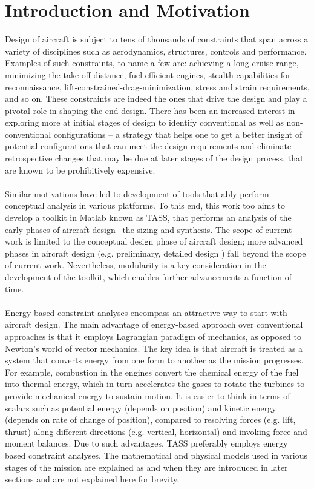 \documentclass[pdftex,11pt,letter]{article}
\begin{document}
\section{Introduction and Motivation}

Design of aircraft is subject to tens of thousands of constraints that span across a variety of disciplines such as aerodynamics, structures, controls and performance\cite{NicolaiText,FieldingText,HoweText,RaymerText}. Examples of such constraints, to name a few are: achieving a long cruise range, minimizing the take-off distance, fuel-efficient engines, stealth capabilities for reconnaissance, lift-constrained-drag-minimization, stress and strain requirements, and so on. These constraints are indeed the ones that drive the design and play a pivotal role in shaping the end-design. There has been an increased interest in exploring more at initial stages of design to identify conventional as well as non-conventional configurations -- a strategy that helps one to get a better insight of potential configurations that can meet the design requirements and eliminate retrospective changes that may be due at later stages of the design process, that are known to be prohibitively expensive. 
\\\\
Similar motivations have led to development of tools that ably perform conceptual analysis in various platforms\cite{Raymer2004, Kroo2005}. To this end, this work too aims to develop a toolkit in Matlab\cite{MATLAB} known as TASS, that performs an analysis of the early phases of aircraft design \ie~the sizing and synthesis. The scope of current work is limited to the conceptual design phase of aircraft design; more advanced phases in aircraft design (e.g. preliminary, detailed design \etc) fall beyond the scope of current work. Nevertheless, modularity is a key consideration in the development of the toolkit, which enables further advancements a function of time.
\\\\
Energy based constraint analyses encompass an attractive way to start with aircraft design. The main advantage of energy-based approach over conventional approaches is that it employs Lagrangian paradigm of mechanics, as opposed to Newton's world of vector mechanics. The key idea is that aircraft is treated as a system that converts energy from one form to another as the mission progresses. For example, combustion in the engines convert the chemical energy of the fuel into thermal energy, which in-turn accelerates the gases to rotate the turbines to provide mechanical energy to sustain motion. It is easier to think in terms of scalars such as potential energy (depends on position) and  kinetic energy (depends on rate of change of position), compared to resolving forces (e.g. lift, thrust)  along different directions (e.g. vertical, horizontal) and invoking force and moment balances. Due to such advantages, \textsc{TASS} preferably employs energy based constraint analyses. The mathematical and physical models used in various stages of the mission are explained as and when they are introduced in later sections and are not explained here for brevity.
\end{document}
